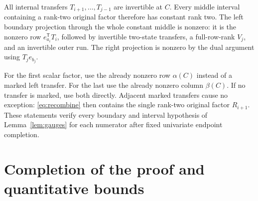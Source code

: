 \documentclass[11pt]{article}
\begin{document}
All internal transfers \(T_{i+1},\ldots,T_{j-1}\) are invertible at
\(C\). Every middle interval containing a rank-two original factor
therefore has constant rank two. The left boundary projection through
the whole constant middle is nonzero: it is the nonzero row
\(e_{a_i}^{\mathsf T}T_i\), followed by invertible two-state transfers,
a full-row-rank \(V_j\), and an invertible outer run. The right
projection is nonzero by the dual argument using \(T_je_{b_j}\).

For the first scalar factor, use the already nonzero row \(\alpha(C)\)
instead of a marked left transfer. For the last use the already nonzero
column \(\beta(C)\). If no transfer is marked, use both directly.
Adjacent marked transfers cause no exception: \eqref{eq:recombine}
then contains the single rank-two original factor \(R_{i+1}\).
These statements verify every boundary and interval hypothesis of
Lemma~\ref{lem:gauges} for each numerator after fixed univariate endpoint
completion.

\section{Completion of the proof and quantitative bounds}
\end{document}
